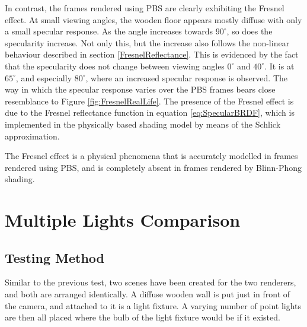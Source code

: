 In contrast, the frames rendered using PBS are clearly exhibiting the Fresnel effect. At small viewing angles, the wooden floor appears mostly diffuse with only a small specular response. As the angle increases towards \begin{math}90^{\circ}\end{math}, so does the specularity increase. Not only this, but the increase also follows the non-linear behaviour described in section \ref{FresnelReflectance}. This is evidenced by the fact that the specularity does not change between viewing angles \begin{math}0^{\circ}\end{math} and \begin{math}40^{\circ}\end{math}. It is at \begin{math}65^{\circ}\end{math}, and especially \begin{math}80^{\circ}\end{math}, where an increased specular response is observed. The way in which the specular response varies over the PBS frames bears close resemblance to Figure \ref{fig:FresnelRealLife}. The presence of the Fresnel effect is due to the Fresnel reflectance function in equation \ref{eq:SpecularBRDF}, which is implemented in the physically based shading model by means of the Schlick approximation.

The Fresnel effect is a physical phenomena that is accurately modelled in frames rendered using PBS, and is completely absent in frames rendered by Blinn-Phong shading.

\section{Multiple Lights Comparison} \label{MultipleLightsComparison}

\subsection{Testing Method}

Similar to the previous test, two scenes have been created for the two renderers, and both are arranged identically. A diffuse wooden wall is put just in front of the camera, and attached to it is a light fixture. A varying number of point lights are then all placed where the bulb of the light fixture would be if it existed.

